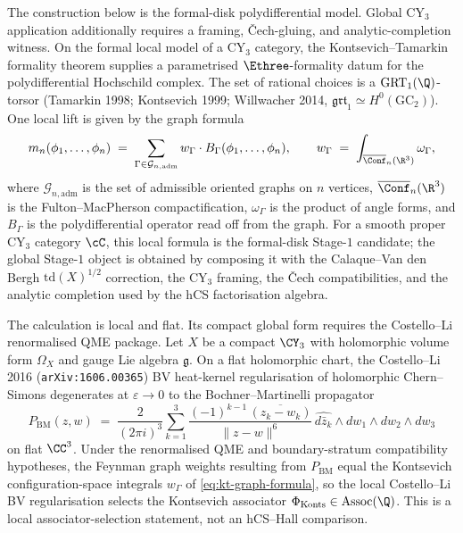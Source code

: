 \begin{theorem}[Local Kontsevich--Tamarkin \texorpdfstring{$\Ethree$}{Ethree}-formality datum at \texorpdfstring{$d=3$}{d=3}]
\label{thm:kt-formality-d3}
The construction below is the formal-disk polydifferential model.
Global CY$_3$ application additionally requires a framing,
\v{C}ech-gluing, and analytic-completion witness.
On the formal local model of a CY$_3$ category, the
Kontsevich--Tamarkin formality theorem supplies a parametrised
$\Ethree$-formality datum for the polydifferential Hochschild complex.
The set of rational choices is a $\mathrm{GRT}_1(\Q)$-torsor
(Tamarkin 1998; Kontsevich 1999; Willwacher 2014,
$\mathfrak{grt}_1\simeq H^0(\mathrm{GC}_2)$). One local lift is given by
the graph formula
\begin{equation}
\label{eq:kt-graph-formula}
m_n(\phi_1, \ldots, \phi_n) \;=\; \sum_{\Gamma \in \mathcal G_{n,\mathrm{adm}}} w_\Gamma \cdot B_\Gamma(\phi_1, \ldots, \phi_n), \qquad w_\Gamma \;=\; \int_{\overline{\Conf}_n(\R^3)} \omega_\Gamma,
\end{equation}
where $\mathcal G_{n,\mathrm{adm}}$ is the set of admissible oriented
graphs on $n$ vertices, $\overline{\Conf}_n(\R^3)$ is the
Fulton--MacPherson compactification, $\omega_\Gamma$ is the product of
angle forms, and $B_\Gamma$ is the polydifferential operator read off
from the graph. For a smooth proper CY$_3$ category $\cC$, this local formula is the
formal-disk Stage-$1$ candidate; the global Stage-$1$ object is
obtained by composing it with the Calaque--Van den Bergh
$\mathrm{td}(X)^{1/2}$ correction, the CY$_3$ framing, the \v{C}ech
compatibilities, and the analytic completion used by the hCS
factorisation algebra.
\end{theorem}

\begin{proposition}
\label{prop:costello-li-bv-kontsevich}
The calculation is local and flat. Its compact global form requires the
Costello--Li renormalised QME package.
Let $X$ be a compact $\CY_3$ with holomorphic volume form $\Omega_X$ and gauge Lie algebra $\mathfrak g$. On a flat holomorphic chart, the Costello--Li 2016 (\texttt{arXiv:1606.00365}) BV heat-kernel regularisation of holomorphic Chern--Simons degenerates at $\varepsilon \to 0$ to the Bochner--Martinelli propagator
\begin{equation}
\label{eq:bm-propagator}
P_{\mathrm{BM}}(z, w) \;=\; \frac{2}{(2\pi i)^3} \sum_{k=1}^{3} \frac{(-1)^{k-1}\, \overline{(z_k - w_k)}}{\|z - w\|^6}\, \widehat{d\bar z_k} \wedge dw_1 \wedge dw_2 \wedge dw_3
\end{equation}
on flat $\CC^3$. Under the renormalised QME and boundary-stratum
compatibility hypotheses, the Feynman graph weights resulting from
$P_{\mathrm{BM}}$ equal the Kontsevich configuration-space integrals
$w_\Gamma$ of \eqref{eq:kt-graph-formula}, so the local Costello--Li BV
regularisation selects the Kontsevich associator
$\Phi_{\mathrm{Konts}}\in\mathrm{Assoc}(\Q)$. This is a local
associator-selection statement, not an hCS--Hall comparison.
\end{proposition}

